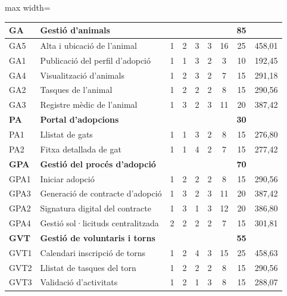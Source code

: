 \documentclass[11pt,a4paper]{report}
\begin{document}
\begin{table}[H]
\begin{adjustbox}{max width=\textwidth}
\begin{tabular}{|l|l|c|c|c|c|c|c|r|}
        \rowcolor{gray!20}
        \textbf{GA} & \textbf{Gestió d'animals} & & & & & & \textbf{85} & \\
        \hline
        GA5  & Alta i ubicació de l'animal         &  1 & 2 & 3 &  3 & 16 & 25 & 458,01 \\
        \hline
        GA1  & Publicació del perfil d'adopció     &  1 & 1 & 3 &  2 &  3 & 10 & 192,45 \\
        \hline
        GA4  & Visualització d'animals             &  1 & 2 & 3 &  2 &  7 & 15 & 291,18 \\
        \hline
        GA2  & Tasques de l'animal                 &  1 & 2 & 2 &  2 &  8 & 15 & 290,56 \\
        \hline
        GA3  & Registre mèdic de l'animal          &  1 & 3 & 2 &  3 & 11 & 20 & 387,42 \\
        \hline

        \rowcolor{gray!20}
        \textbf{PA} & \textbf{Portal d'adopcions} & & & & & & \textbf{30} & \\
        \hline
        PA1  & Llistat de gats                     &  1 & 1 & 3 &  2 &  8 & 15 & 276,80 \\
        \hline
        PA2  & Fitxa detallada de gat              &  1 & 1 & 4 &  2 &  7 & 15 & 277,42 \\
        \hline

        \rowcolor{gray!20}
        \textbf{GPA} & \textbf{Gestió del procés d'adopció} & & & & & & \textbf{70} & \\
        \hline
        GPA1 & Iniciar adopció                     &  1 & 2 & 2 &  2 &  8 & 15 & 290,56 \\
        \hline
        GPA3 & Generació de contracte d'adopció    &  1 & 3 & 2 &  3 & 11 & 20 & 387,42 \\
        \hline
        GPA2 & Signatura digital del contracte     &  1 & 3 & 1 &  3 & 12 & 20 & 386,80 \\
        \hline
        GPA4 & Gestió sol·licituds centralitzada   &  2 & 2 & 2 &  2 &  7 & 15 & 301,81 \\
        \hline

        \rowcolor{gray!20}
        \textbf{GVT} & \textbf{Gestió de voluntaris i torns} & & & & & & \textbf{55} & \\
        \hline
        GVT1 & Calendari inscripció de torns       &  1 & 2 & 4 &  3 & 15 & 25 & 458,63 \\
        \hline
        GVT2 & Llistat de tasques del torn         &  1 & 2 & 2 &  2 &  8 & 15 & 290,56 \\
        \hline
        GVT3 & Validació d'activitats              &  1 & 2 & 1 &  3 &  8 & 15 & 288,07 \\
        \hline


\end{tabular}
\end{adjustbox}
\end{table}
\end{document}
